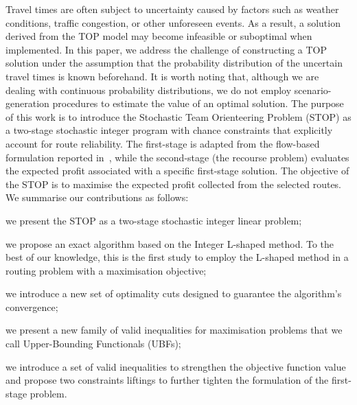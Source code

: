 \documentclass[11pt]{article}
\theoremstyle{definition}
\begin{document}
Travel times are often subject to uncertainty caused by factors such as weather conditions, traffic congestion, or other unforeseen events. As a result, a solution derived from the TOP model may become infeasible or suboptimal when implemented. In this paper, we address the challenge of constructing a TOP solution under the assumption that the probability distribution of the uncertain travel times is known beforehand. It is worth noting that, although we are dealing with continuous probability distributions, we do not employ scenario-generation procedures to estimate the value of an optimal solution. The purpose of this work is to introduce the Stochastic Team Orienteering Problem (STOP) as a two-stage stochastic integer program with chance constraints that explicitly account for route reliability. The first-stage is adapted from the flow-based formulation reported in~\citet{Guastalla2025}, while the second-stage (the recourse problem) evaluates the expected profit associated with a specific first-stage solution. The objective of the STOP is to maximise the expected profit collected from the selected routes.
%
We summarise our contributions as follows:
%
\begin{inparaenum}[(i)]
\item we present the STOP as a two-stage stochastic integer linear problem;
%
\item we propose an exact algorithm based on the Integer L-shaped method. To the best of our knowledge, this is the first study to employ the L-shaped method in a routing problem with a maximisation objective;
%
\item we introduce a new set of optimality cuts designed to guarantee the algorithm's convergence;
%
\item we present a new family of valid inequalities for maximisation problems that we call Upper-Bounding Functionals (UBFs);
%
\item we introduce a set of valid inequalities to strengthen the objective function value and propose two constraints liftings to further tighten the formulation of the first-stage problem.
\end{inparaenum}
\end{document}
